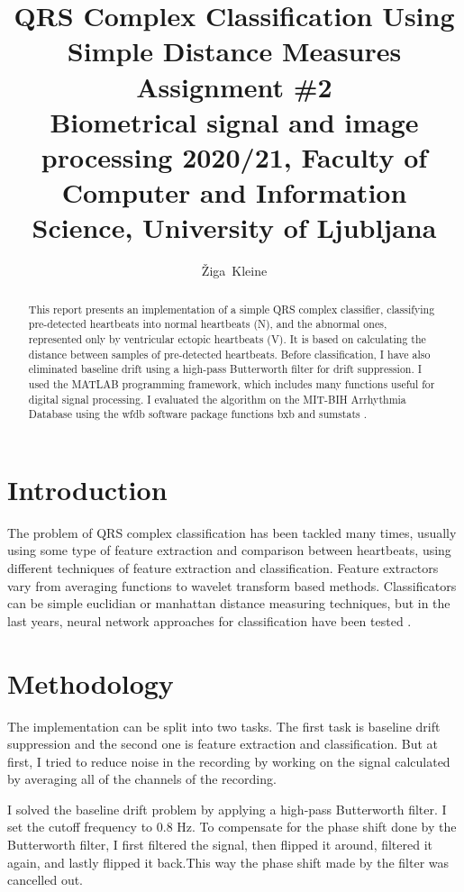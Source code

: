 \documentclass[9pt]{IEEEtran}
\title{\vspace{0ex} %
QRS Complex Classification Using Simple Distance Measures
\\ \large{Assignment \#2}\\ \normalsize{Biometrical signal and image processing 2020/21, Faculty of Computer and Information Science, University of Ljubljana}}
\author{ %
Žiga~Kleine
\vspace{-4.0ex}
}
\begin{document}
\maketitle

\begin{abstract}


This report presents an implementation of a simple QRS complex classifier, classifying pre-detected heartbeats into normal heartbeats (N), and the abnormal ones, represented only by ventricular ectopic heartbeats (V). It is based on calculating the distance between samples of pre-detected heartbeats. Before classification, I have also eliminated baseline drift using a  high-pass Butterworth filter for drift suppression. I used the MATLAB programming framework, which includes many functions useful for digital signal processing. I evaluated the algorithm on the MIT-BIH Arrhythmia Database using the wfdb software package functions bxb and sumstats \cite{moody2001impact, goldberger2000physiobank}. 

\end{abstract}

\section{Introduction}

The problem of QRS complex classification has been tackled many times, usually using some type of feature extraction and comparison between heartbeats, using different techniques of feature extraction and classification. Feature extractors vary from averaging functions to wavelet transform based methods. Classificators can be simple euclidian or manhattan distance measuring techniques, but in the last years, neural network approaches for classification have been tested \cite{singh2014automatic, chen2003development, abibullaev2011new}.

\section{Methodology}

The implementation can be split into two tasks. The first task is baseline drift suppression and the second one is feature extraction and classification. But at first, I tried to reduce noise in the recording by working on the signal calculated by averaging all of the channels of the recording. 

I solved the baseline drift problem by applying a high-pass Butterworth filter. I set the cutoff frequency to 0.8 Hz. To compensate for the phase shift done by the Butterworth filter, I first filtered the signal, then flipped it around, filtered it again, and lastly flipped it back.This way the phase shift made by the filter was cancelled out.  
\end{document}

